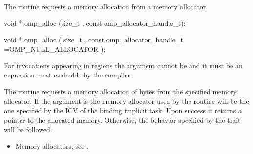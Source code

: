 \begin{ccppspecific}

\subsection{}
\label{subsec:omp_alloc}

\summary
The  routine requests a memory allocation from a memory allocator.

\format
\begin{cspecific}
\begin{ompcFunction}
void * omp_alloc (size_t , const omp_allocator_handle_t);
\end{ompcFunction}
\end{cspecific}
\begin{cppspecific}
\begin{ompcFunction}
void * omp_alloc (
  size_t ,
  const omp_allocator_handle_t =OMP_NULL_ALLOCATOR
);
\end{ompcFunction}
\end{cppspecific}

\constraints

For  invocations appearing in  regions the  argument cannot be  and it must be an expression must evaluable by the compiler.

\effect

The  routine requests a memory allocation of  bytes from the specified memory allocator. If the  argument is
 the memory allocator used by the routine will be the one specified by the  ICV of the binding implicit task.
Upon success it returns a pointer to the allocated memory. Otherwise, the behavior specified by the  trait will be followed.

\crossreferences
\begin{itemize}
\item Memory allocators, see .
\end{itemize}

\subsection{}
\label{subsec:omp_free}


\end{ccppspecific}
